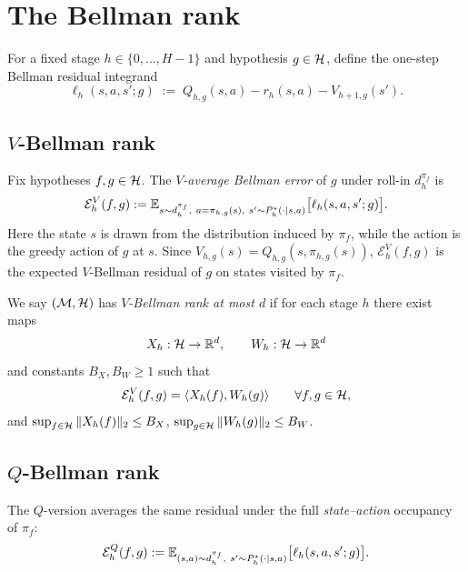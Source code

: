 \section{The Bellman rank}
\label{sec:br_rank_def}

For a fixed stage $h\in\{0,\dots,H-1\}$ and hypothesis $g\in\mathcal{H}$, define the one-step Bellman
residual integrand
\[
\ell_h(s,a,s';g)
\;:=\;
Q_{h,g}(s,a) - r_h(s,a) - V_{h+1,g}(s').
\]

\subsection{$V$-Bellman rank}
\label{subsec:br_v_rank}

Fix hypotheses $f,g\in\mathcal{H}$. The \emph{$V$-average Bellman error} of $g$ under roll-in $d_h^{\pi_f}$ is
\begin{equation}
\label{eq:br_v_bellman_error}
\mathcal{E}_h^{V}(f,g)
:=
\mathbb{E}_{s\sim d_h^{\pi_f},\ a=\pi_{h,g}(s),\ s'\sim P_h^\star(\cdot\mid s,a)}
\big[\ell_h(s,a,s';g)\big].
\end{equation}
Here the state $s$ is drawn from the distribution induced by $\pi_f$, while the action is the greedy
action of $g$ at $s$. Since $V_{h,g}(s)=Q_{h,g}(s,\pi_{h,g}(s))$, $\mathcal{E}_h^{V}(f,g)$ is the expected
$V$-Bellman residual of $g$ on states visited by $\pi_f$.

\begin{definition}
\label{def:v_bellman_rank}
We say $(\mathcal{M},\mathcal{H})$ has \emph{$V$-Bellman rank at most $d$} if for each stage $h$ there exist maps
\[
X_h:\mathcal{H}\to\mathbb{R}^d,\qquad W_h:\mathcal{H}\to\mathbb{R}^d
\]
and constants $B_X,B_W\ge 1$ such that
\[
\mathcal{E}_h^{V}(f,g)=\langle X_h(f), W_h(g)\rangle\qquad \forall f,g\in\mathcal{H},
\]
and $\sup_{f\in\mathcal{H}}\|X_h(f)\|_2\le B_X$, $\sup_{g\in\mathcal{H}}\|W_h(g)\|_2\le B_W$.
\end{definition}

\subsection{$Q$-Bellman rank}
\label{subsec:br_q_rank}

The $Q$-version averages the same residual under the full \emph{state--action} occupancy of $\pi_f$:
\begin{equation}
\label{eq:br_q_bellman_error}
\mathcal{E}_h^{Q}(f,g)
:=
\mathbb{E}_{(s,a)\sim d_h^{\pi_f},\ s'\sim P_h^\star(\cdot\mid s,a)}
\big[\ell_h(s,a,s';g)\big].
\end{equation}

